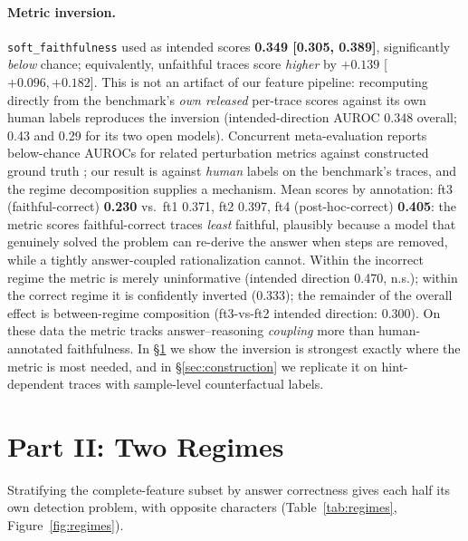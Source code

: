 \documentclass[11pt]{article}
\begin{document}
\paragraph{Metric inversion.} \texttt{soft\_faithfulness} used as intended scores \textbf{0.349 [0.305, 0.389]}, significantly \emph{below} chance; equivalently, unfaithful traces score \emph{higher} by $+0.139$ [$+0.096, +0.182$]. This is not an artifact of our feature pipeline: recomputing directly from the benchmark's \emph{own released} per-trace scores against its own human labels reproduces the inversion (intended-direction AUROC 0.348 overall; 0.43 and 0.29 for its two open models). Concurrent meta-evaluation reports below-chance AUROCs for related perturbation metrics against constructed ground truth \citep{gurarieh2026bonafide}; our result is against \emph{human} labels on the benchmark's traces, and the regime decomposition supplies a mechanism. Mean scores by annotation: ft3 (faithful-correct) \textbf{0.230} vs.\ ft1 0.371, ft2 0.397, ft4 (post-hoc-correct) \textbf{0.405}: the metric scores faithful-correct traces \emph{least} faithful, plausibly because a model that genuinely solved the problem can re-derive the answer when steps are removed, while a tightly answer-coupled rationalization cannot. Within the incorrect regime the metric is merely uninformative (intended direction 0.470, n.s.); within the correct regime it is confidently inverted (0.333); the remainder of the overall effect is between-regime composition (ft3-vs-ft2 intended direction: 0.300). On these data the metric tracks answer--reasoning \emph{coupling} more than human-annotated faithfulness. In \S\ref{sec:regimes} we show the inversion is strongest exactly where the metric is most needed, and in \S\ref{sec:construction} we replicate it on hint-dependent traces with sample-level counterfactual labels.

\section{Part II: Two Regimes}
\label{sec:regimes}

Stratifying the complete-feature subset by answer correctness gives each half its own detection problem, with opposite characters (Table~\ref{tab:regimes}, Figure~\ref{fig:regimes}).
\end{document}
